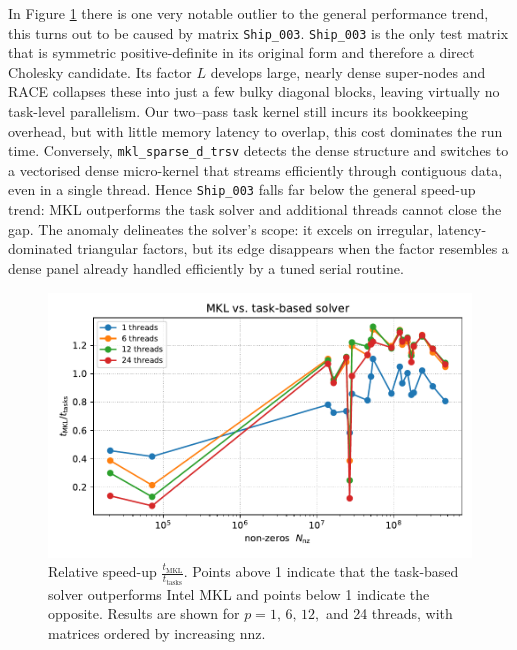 In Figure \ref{fig:rel_speedup_mkl_tasks} there is one very notable outlier to the general performance trend, this turns out to be caused by matrix \texttt{Ship\_003}.
\texttt{Ship\_003} is the only test matrix that is symmetric positive-definite in its original form and therefore a direct Cholesky candidate. Its factor $L$ develops large, nearly dense super-nodes and RACE collapses these into just a few bulky diagonal blocks, leaving virtually no task-level parallelism. Our two–pass task kernel still incurs its bookkeeping overhead, but with little memory latency to overlap, this cost dominates the run time.
Conversely, \texttt{mkl\_sparse\_d\_trsv} detects the dense structure and switches to a vectorised dense micro-kernel that streams efficiently through contiguous data, even in a single thread.
Hence \texttt{Ship\_003} falls far below the general speed-up trend: MKL outperforms the task solver and additional threads cannot close the gap.
The anomaly delineates the solver’s scope: it excels on irregular, latency-dominated triangular factors, but its edge disappears when the factor resembles a dense panel already handled efficiently by a tuned serial routine.
\begin{figure}
    \centering
    \includegraphics[width=1\linewidth]{report//figures//results/rel_speedup_mkl_vs_tasks.pdf}
    \caption{Relative speed-up $\displaystyle\frac{t_{\text{MKL}}}{t_{\text{tasks}}}$.
Points above 1 indicate that the task-based solver outperforms Intel MKL and
points below 1 indicate the opposite.  Results are shown for
$p = 1,\,6,\,12,$ and 24 threads, with matrices ordered by increasing
$\mathrm{nnz}$.}
    \label{fig:rel_speedup_mkl_tasks}
\end{figure}


